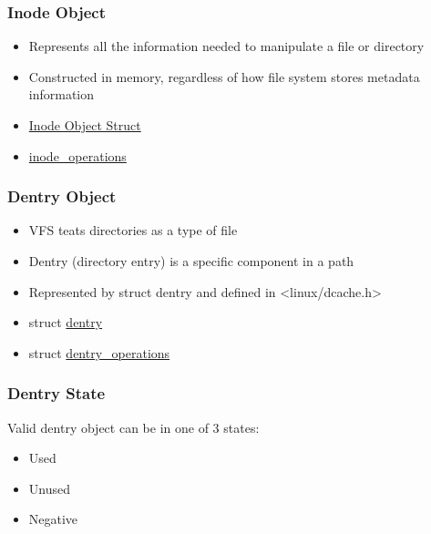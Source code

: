 \begin{frame}[fragile]
    \frametitle{Inode Object}


    \begin{itemize}
        \item Represents all the information needed to manipulate a file or directory
        \item Constructed in memory, regardless of how file system stores metadata information
        \item \href{https://elixir.bootlin.com/linux/latest/source/include/linux/fs.h\#L623}{Inode Object Struct}
        \item \href{https://elixir.bootlin.com/linux/latest/source/include/linux/fs.h\#L2113}{inode\_operations}
    \end{itemize}
% 
\end{frame}
\begin{frame}[fragile]
    \frametitle{Dentry Object}


    \begin{itemize}
        \item VFS teats directories as a type of file
        \item Dentry (directory entry) is a specific component in a path
        \item Represented by struct dentry and defined in <linux/dcache.h>
        \item struct \href{https://elixir.bootlin.com/linux/v5.7-rc4/source/include/linux/dcache.h\#L89}{dentry}
        \item struct \href{https://elixir.bootlin.com/linux/v5.7-rc4/source/include/linux/dcache.h\#L135}{dentry\_operations}
    \end{itemize}
% 
\end{frame}
\begin{frame}[fragile]
    \frametitle{Dentry State}

% 
Valid dentry object can be in one of 3 states:

    \begin{itemize}
        \item Used
        \item Unused
        \item Negative
    \end{itemize}
% 
\end{frame}
